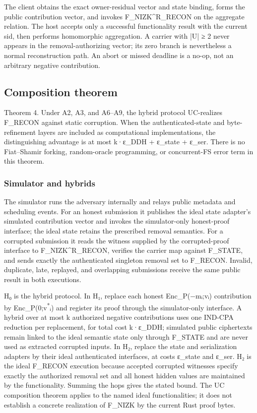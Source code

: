 \documentclass[11pt]{article}
\begin{document}
The client obtains the exact owner-residual vector and state binding, forms the public contribution vector, and invokes F\_NIZK\^{}R\_RECON on the aggregate relation. The host accepts only a successful functionality result with the current sid, then performs homomorphic aggregation. A carrier with |U| ≥ 2 never appears in the removal-authorizing vector; its zero branch is nevertheless a normal reconstruction path. An abort or missed deadline is a no-op, not an arbitrary negative contribution.

\subsection{Composition theorem}

Theorem 4. Under A2, A3, and A6–A9, the hybrid protocol UC-realizes F\_RECON against static corruption. When the authenticated-state and byte-refinement layers are included as computational implementations, the distinguishing advantage is at most k·ε\_DDH + ε\_state + ε\_ser. There is no Fiat–Shamir forking, random-oracle programming, or concurrent-FS error term in this theorem.

\subsubsection{Simulator and hybrids}

The simulator runs the adversary internally and relays public metadata and scheduling events. For an honest submission it publishes the ideal state adapter’s simulated contribution vector and invokes the simulator-only honest-proof interface; the ideal state retains the prescribed removal semantics. For a corrupted submission it reads the witness supplied by the corrupted-proof interface to F\_NIZK\^{}R\_RECON, verifies the carrier map against F\_STATE, and sends exactly the authenticated singleton removal set to F\_RECON. Invalid, duplicate, late, replayed, and overlapping submissions receive the same public result in both executions.

H₀ is the hybrid protocol. In H₁, replace each honest Enc\_P(−mᵢ;vᵢ) contribution by Enc\_P(0;v\textsuperscript{*}ᵢ) and register its proof through the simulator-only interface. A hybrid over at most k authorized negative contributions uses one IND-CPA reduction per replacement, for total cost k·ε\_DDH; simulated public ciphertexts remain linked to the ideal semantic state only through F\_STATE and are never used as extracted corrupted inputs. In H₂, replace the state and serialization adapters by their ideal authenticated interfaces, at costs ε\_state and ε\_ser. H₂ is the ideal F\_RECON execution because accepted corrupted witnesses specify exactly the authorized removal set and all honest hidden values are maintained by the functionality. Summing the hops gives the stated bound. The UC composition theorem applies to the named ideal functionalities; it does not establish a concrete realization of F\_NIZK by the current Rust proof bytes.
\end{document}
